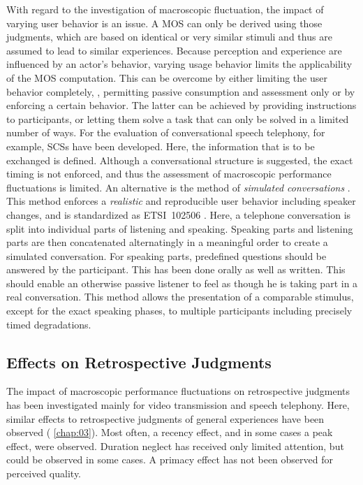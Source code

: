 With regard to the investigation of macroscopic fluctuation, the impact of varying user behavior is an issue.
A \ac{MOS} can only be derived using those judgments, which are based on identical or very similar stimuli and thus are assumed to lead to similar experiences.
Because perception and experience are influenced by an actor's behavior, varying usage behavior limits the applicability of the \ac{MOS} computation.
This can be overcome by either limiting the user behavior completely, \ie, permitting passive consumption and assessment only or by enforcing a certain behavior.
The latter can be achieved by providing instructions to participants, or letting them solve a task that can only be solved in a limited number of ways.
For the evaluation of conversational speech telephony, for example, \acp{SCS} have been developed.
Here, the information that is to be exchanged is defined.
Although a conversational structure is suggested, the exact timing is not enforced, and thus the assessment of macroscopic performance fluctuations is limited.
An alternative is the method of \emph{simulated conversations} \citep{weiss_modeling_2009, berger_estimation_2008}.
This method enforces a \emph{realistic} and reproducible user behavior including speaker changes, and is standardized as ETSI~102506 \citep{etsi_speech_2011}.
Here, a telephone conversation is split into individual parts of listening and speaking.
Speaking parts and listening parts are then concatenated alternatingly in a meaningful order to create a simulated conversation.
For speaking parts, predefined questions should be answered by the participant.
This has been done orally as well as written.
This should enable an otherwise passive listener to feel as though he is taking part in a real conversation.
This method allows the presentation of a comparable stimulus, except for the exact speaking phases, to multiple participants including precisely timed degradations.

\subsection{Effects on Retrospective Judgments}
The impact of macroscopic performance fluctuations on retrospective judgments has been investigated mainly for video transmission and speech telephony.
Here, similar effects to retrospective judgments of general experiences have been observed (\cf{} \autoref{chap:03}).
Most often, a recency effect, and in some cases a peak effect, were observed.
Duration neglect has received only limited attention, but could be observed in some cases.
A primacy effect has not been observed for perceived quality.

